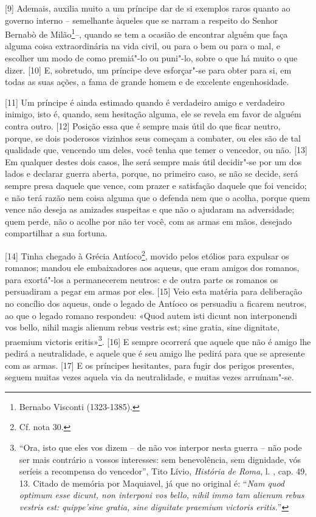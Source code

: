 {[}9{]} Ademais, auxilia muito a um príncipe dar de si exemplos raros
quanto ao governo interno -- semelhante àqueles que se narram a respeito
do Senhor Bernabò de Milão\footnote{Bernabo Visconti (1323-1385).}--,
quando se tem a ocasião de encontrar alguém que faça alguma coisa
extraordinária na vida civil, ou para o bem ou para o mal, e escolher um
modo de como premiá"-lo ou puni"-lo, sobre o que há muito o que dizer.
{[}10{]} E, sobretudo, um príncipe deve esforçar"-se para obter para si,
em todas as suas ações, a fama de grande homem e de excelente
engenhosidade.

{[}11{]} Um príncipe é ainda estimado quando é verdadeiro amigo e
verdadeiro inimigo, isto é, quando, sem hesitação alguma, ele se revela
em favor de alguém contra outro. {[}12{]} Posição essa que é sempre mais
útil do que ficar neutro, porque, se dois poderosos vizinhos seus
começam a combater, ou eles são de tal qualidade que, vencendo um deles,
você tenha que temer o vencedor, ou não. {[}13{]} Em qualquer destes
dois casos, lhe será sempre mais útil decidir"-se por um dos lados e
declarar guerra aberta, porque, no primeiro caso, se não se decide, será
sempre presa daquele que vence, com prazer e satisfação daquele que foi
vencido; e não terá razão nem coisa alguma que o defenda nem que o
acolha, porque quem vence não deseja as amizades suspeitas e que não o
ajudaram na adversidade; quem perde, não o acolhe por não ter você, com
as armas em mãos, desejado compartilhar a sua fortuna.

{[}14{]} Tinha chegado à Grécia Antíoco\footnote{Cf. nota 30.}, movido
pelos etólios para expulsar os romanos; mandou ele embaixadores aos
aqueus, que eram amigos dos romanos, para exortá"-los a permanecerem
neutros: e de outra parte os romanos os persuadiram a pegar em armas por
eles. {[}15{]} Veio esta matéria para deliberação no concílio dos
aqueus, onde o legado de Antíoco os persuadiu a ficarem neutros, ao que
o legado romano respondeu: «Quod autem isti dicunt non interponendi vos
bello, nihil magis alienum rebus vestris est; sine gratia, sine
dignitate, praemium victoris eritis»\footnote{``Ora, isto que eles vos
  dizem -- de não vos interpor nesta guerra -- não pode ser mais
  contrário a vossos interesses: sem benevolência, sem dignidade, vós
  seríeis a recompensa do vencedor'', Tito Lívio, \emph{História de
  Roma}, l. , cap. 49, 13. Citado de memória por Maquiavel, já que
  no original é: ``\emph{Nam quod optimum esse dicunt, non interponi vos
  bello, nihil immo tam alienum rebus vestris est: quippe'sine gratia,
  sine dignitate praemium victoris eritis.}''}. {[}16{]} E sempre
ocorrerá que aquele que não é amigo lhe pedirá a neutralidade, e aquele
que é seu amigo lhe pedirá para que se apresente com as armas. {[}17{]}
E os príncipes hesitantes, para fugir dos perigos presentes, seguem
muitas vezes aquela via da neutralidade, e muitas vezes arruínam"-se.

